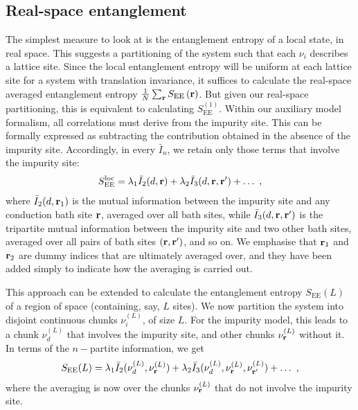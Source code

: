 \documentclass[reprint,hidelinks,onecolumn]{revtex4-2}
\begin{document}
\subsection{Real-space entanglement}
The simplest measure to look at is the entanglement entropy of a local state, in real space. This suggests a partitioning of the system such that each \(\nu_i\) describes a lattice site. Since the local entanglement entropy will be uniform at each lattice site for a system with translation invariance, it suffices to calculate the real-space averaged entanglement entropy \(\frac{1}{N}\sum_{{\bf r}}S_\text{EE}\left( {\bf r} \right) \). But given our real-space partitioning, this is equivalent to calculating \(S_\text{EE}^{(1)}\). Within our auxiliary model formalism, all correlations must derive from the impurity site. This can be formally expressed as subtracting the contribution obtained in the absence of the impurity site. Accordingly, in every \(\bar I_n\), we retain only those terms that involve the impurity site:
\begin{equation}\begin{aligned}\label{localEnt}
	S_\text{EE}^{\text{loc}} = \lambda_1 \bar I_2(d,{\bf r}) + \lambda_2 \bar I_3(d,{\bf r},{\bf r}^\prime) + \ldots~,
\end{aligned}\end{equation}
where \(\bar I_2(d,{\bf r}_1)\) is the mutual information between the impurity site and any conduction bath site \({\bf r}\), averaged over all bath sites, while \(\bar I_3(d,{\bf r},{\bf r}^\prime)\) is the tripartite mutual information between the impurity site and two other bath sites, averaged over all pairs of bath sites \(\left({\bf r},{\bf r}^\prime\right) \), and so on. We emphasise that \({\bf r}_1\) and \({\bf r}_2\) are dummy indices that are ultimately averaged over, and they have been added simply to indicate how the averaging is carried out.

This approach can be extended to calculate the entanglement entropy \(S_\text{EE}(L)\) of a region of space (containing, say, \(L\) sites). We now partition the system into disjoint continuous chunks \(\nu_i^{(L)}\), of size \(L\). For the impurity model, this leads to a chunk \(\nu^{(L)}_d\) that involves the impurity site, and other chunks \(\nu^{(L)}_{{\bf r}}\) without it. In terms of the \(n-\)partite information, we get
\begin{equation}\begin{aligned}
	S_\text{EE}(L) = \lambda_1 \bar I_2(\nu^{(L)}_d,\nu^{(L)}_{\bf r}) + \lambda_2 \bar I_3(\nu^{(L)}_d,\nu^{(L)}_{\bf r},\nu^{(L)}_{\bf r^\prime}) + \ldots~,
\end{aligned}\end{equation}
where the averaging is now over the chunks \(\nu^{(L)}_{\bf r}\) that do not involve the impurity site.
\end{document}
